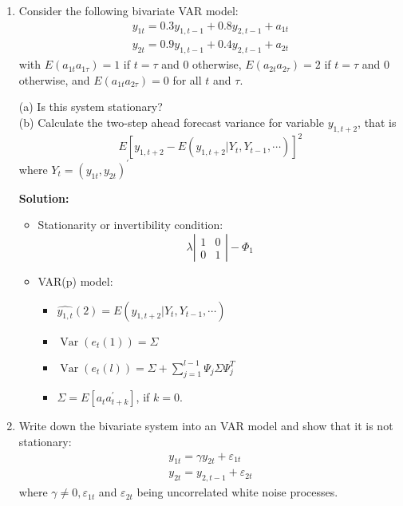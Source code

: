 \documentclass{article}
\begin{document}
\begin{enumerate}
	
	\item Consider the following bivariate VAR model:
	\begin{equation*}
	\begin{array}{l}{y_{1 t}=0.3 y_{1, t-1}+0.8 y_{2, t-1}+a_{1 t}} \\ {y_{2 t}=0.9 y_{1, t-1}+0.4 y_{2, t-1}+a_{2 t}}\end{array}
	\end{equation*}
	with $E\left(a_{1 t} a_{1 \tau}\right)=1$ if $t = \tau$ and $0$ otherwise, $E\left(a_{2 t} a_{2 \tau}\right)=2$ if $t = \tau$ and 0 otherwise, and $E\left(a_{1 t} a_{2 \tau}\right)=0$ for all $t$ and $\tau$.
	
	(a) Is this system stationary?\\
	(b) Calculate the two-step ahead forecast variance for variable $y_{1,t+2}$, that is
	\begin{equation*}
	E\left[y_{1, t+2}-E\left(y_{1, t+2} | Y_{t}, Y_{t-1}, \cdots\right)\right]^{2}
	\end{equation*}
	where $Y_t = (y_{1t}, y_{2t})^{\prime}$
	
	\textbf{Solution:}
	\begin{itemize}
		\item Stationarity or invertibility condition:
		\begin{equation*}
		\lambda \left| \begin{array}{cc} 1 & 0 \\ 0 & 1\end{array}\right| - \Phi_1
		\end{equation*}
		\item VAR(p) model:
		\begin{itemize}
			\item $\hat{y_{1,t}}(2) = E\left(y_{1, t+2} | Y_{t}, Y_{t-1}, \cdots\right)$
			\item $\operatorname{Var}\left(e_{t}(1)\right)=\Sigma$
			\item $\operatorname{Var}\left(e_{t}(l)\right)=\Sigma+\sum_{j=1}^{l-1} \Psi_{j} \Sigma \Psi_{j}^{T}$
			\item $\Sigma = E\left[a_{t} a_{t+k}^{\prime}\right]$, if $k = 0$.
		\end{itemize}
	\end{itemize}

	\item Write down the bivariate system into an VAR model and show that it is not stationary:
	\begin{equation*}
	\begin{array}{l}{y_{1 t}=\gamma y_{2 t}+\varepsilon_{1 t}} \\ {y_{2 t}=y_{2, t-1}+\varepsilon_{2 t}}\end{array}
	\end{equation*}
	where $\gamma \neq 0, \varepsilon_{1 t}$ and $\varepsilon_{2 t}$ being uncorrelated white noise processes.
	

\end{enumerate}
\end{document}
